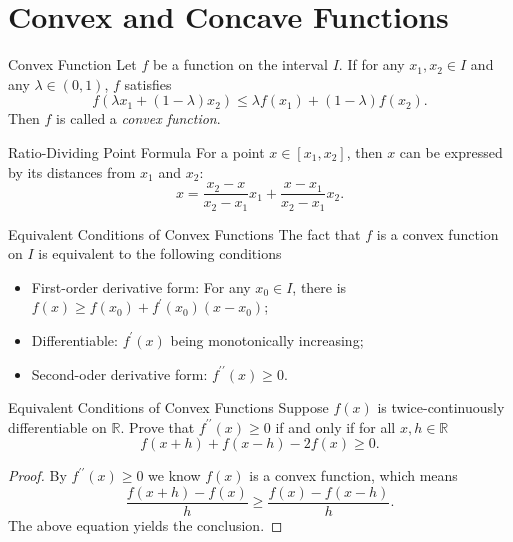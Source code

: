 \section{Convex and Concave Functions}

\begin{definition}{Convex Function}{}
  Let $f$ be a function on the interval $I$.
  If for any $x_1, x_2 \in I$ and any $\lambda \in (0, 1)$,
  $f$ satisfies
  \begin{equation}
    f \left( \lambda x_1 + (1-\lambda)x_2 \right) \leq \lambda f(x_1) + (1-\lambda)f(x_2).
  \end{equation}
  Then $f$ is called a \emph{convex function}.
\end{definition}

\begin{lemma}{Ratio-Dividing Point Formula}{}
  For a point $x \in [x_1, x_2]$, then $x$ can be expressed by
  its distances from $x_1$ and $x_2$:
  \begin{equation}
    x = \frac{x_2 - x}{x_2 - x_1}x_1 + \frac{x - x_1}{x_2 - x_1}x_2.
  \end{equation}
\end{lemma}

\begin{proposition}{Equivalent Conditions of Convex Functions}{}
  The fact that $f$ is a convex function on $I$ is equivalent to
  the following conditions
  \begin{itemize}
  \item First-order derivative form: For any $x_0 \in I$,
    there is $f(x) \geq f(x_0) + f^{\prime}(x_0) (x - x_0)$;
  \item Differentiable: $f^{\prime}(x)$ being monotonically increasing;
  \item Second-oder derivative form: $f^{\prime\prime}(x) \geq 0$.
  \end{itemize}
\end{proposition}

\begin{example}{Equivalent Conditions of Convex Functions}{}
  Suppose $f(x)$ is twice-continuously differentiable on $\mathbb{R}$.
  Prove that $f^{\prime\prime}(x) \geq 0$ if and only if for all $x,h \in \mathbb{R}$
  \begin{equation}
    f(x+h) + f(x-h) -2f(x) \geq 0.
  \end{equation}
\end{example}

\begin{proof}
  By $f^{\prime\prime}(x) \geq 0$ we know $f(x)$ is a convex function,
  which means
  \begin{equation}
    \frac{f(x+h) - f(x)}{h} \geq \frac{f(x) - f(x-h)}{h}.
  \end{equation}
  The above equation yields the conclusion.
\end{proof}

